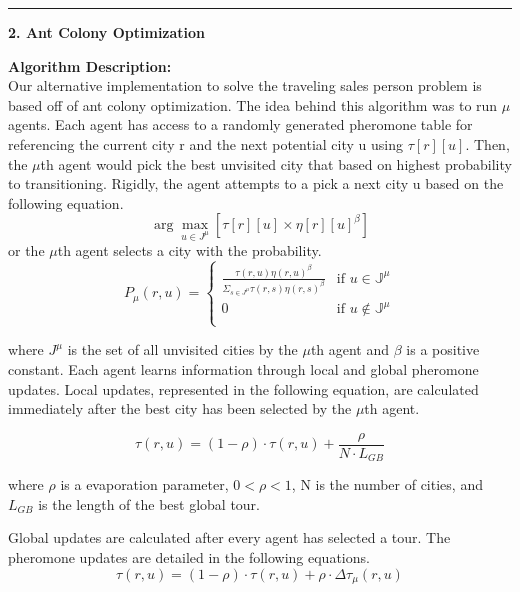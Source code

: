 \documentclass[letter, 12pt]{article}
\newenvironment{question}[1]{%
    \vspace{.2in}%
        \noindent{\bf #1}%
    \vspace{0.3em} \hrule \vspace{.1in}%
}{}
\begin{document}
\begin{question}{\large Traveling Salesperson Problem}
\textbf{\large 2. Ant Colony Optimization}

\textbf{Algorithm Description:}\\
    Our alternative implementation to solve the traveling sales person problem is based off of ant colony optimization. The idea behind this algorithm was to run $\mu$ agents. 
    Each agent has access to a randomly generated pheromone table for referencing the current city r and the next potential city u using $\tau[r][u]$. Then, the $\mu$th agent would pick the best unvisited city that based on highest probability to transitioning. Rigidly, the agent attempts to a pick a next city u based on the following equation.
    \begin{equation}
        \arg\max_{u \in J^{\mu}}[\tau[r][u]\times\eta[r][u]^{\beta}]
    \end{equation}
    or the $\mu$th agent selects a city with the probability.
    \begin{equation}
        P_{\mu}(r, u) = 
        \begin{cases}
            \frac{\tau(r, u)\eta(r,u)^{\beta}}{\Sigma_{s \in J^{\mu}} \tau(r, s)\eta(r,s)^{\beta}} & \text{if } u \in \mathbb{J^{\mu}}\\
            0 & \text{if } u \not\in \mathbb{J^{\mu}}\\
        \end{cases}
    \end{equation}
    
    where $J^{\mu}$ is the set of all unvisited cities by the $\mu$th agent and $\beta$ is a positive constant. Each agent learns information through local and global pheromone updates. Local updates, represented in the following equation, are calculated immediately after the best city has been selected by the $\mu$th agent.
    
    \begin{equation}
        \tau(r, u) = (1 - \rho) \cdotp \tau(r, u) + \frac{\rho}{N \cdotp L_{GB}}
    \end{equation}
    
    where $\rho$ is a evaporation parameter, $0 < \rho < 1$, N is the number of cities, and $L_{GB}$ is the length of the best global tour. 
    
    Global updates are calculated after every agent has selected a tour. The pheromone updates are detailed in the following equations.
    \begin{equation}
        \tau(r, u) = (1 - \rho) \cdotp \tau(r, u)  + \rho \cdotp \Delta \tau_{\mu}(r, u)
    \end{equation}
    

\end{question}
\end{document}

